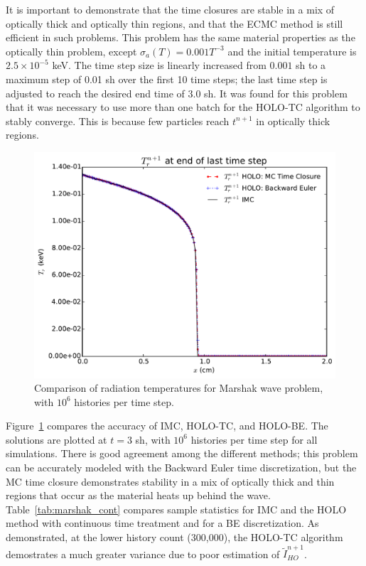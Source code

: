 \documentclass{anstrans}
\begin{document}
It is important to demonstrate that the time closures are stable in a mix of optically
thick and optically thin regions, and that the ECMC method is still efficient in such
problems.  This problem has the same material properties as the optically thin problem, except
$\sigma_a(T) = 0.001 T^{-3}$ and the initial temperature is $2.5\times10^{-5}$ keV.  The time step size is linearly increased from $0.001$ sh to a
maximum step of 0.01 sh over the first 10 time steps; the last time step is adjusted to
reach the desired end time of $3.0$ sh.  It was found for this problem that it was
necessary to use more than one batch for the HOLO-TC algorithm to stably converge.
This is because few particles reach $t^{n+1}$ in optically
thick regions.
\begin{figure}
    \centering
    \includegraphics[width=0.92\linewidth]{marshak_time_cont_compare.pdf}
    \caption{\label{fig:marshak_tc} Comparison of radiation temperatures for Marshak wave problem, with $10^6$ histories per time step.}
\end{figure}

Figure~\ref{fig:marshak_tc} compares the accuracy of IMC, HOLO-TC, and HOLO-BE.  The
solutions are plotted at $t=3$ sh, with $10^6$ histories per time step for all
simulations. There is good agreement among the different methods; this problem can be accurately modeled with the Backward Euler time discretization, but
the MC time closure demonstrates stability in a mix of optically thick and thin
regions that occur as the material heats up behind the wave. Table~\ref{tab:marshak_cont} compares sample statistics for IMC and
the HOLO method with continuous time treatment and for a BE discretization.  As
demonstrated, at the lower history count (300,000), the HOLO-TC algorithm demostrates a
much greater variance due to poor estimation of $\tilde I_{HO}^{n+1}$.  
\end{document}
